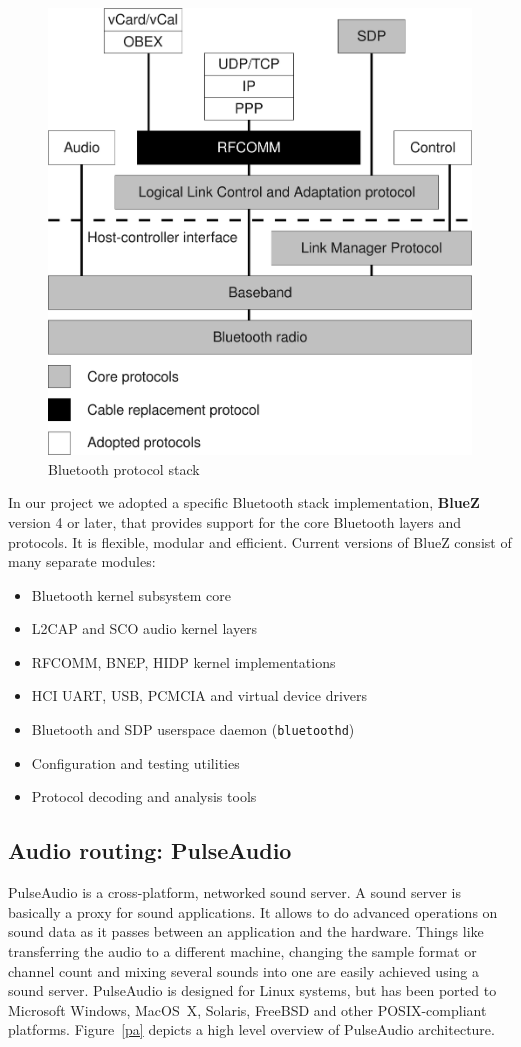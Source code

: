 \documentclass[conference]{IEEEtran}
\begin{document}
\begin{figure}[h]
\centering
\includegraphics[width=0.9\columnwidth]{BTstack}
\caption{Bluetooth protocol stack}
\label{btstack}
\end{figure}

In our project we adopted a specific Bluetooth stack implementation, \textbf{BlueZ} version 4 or later, that provides support for the core Bluetooth layers and protocols. It is flexible, modular and efficient. Current versions of BlueZ consist of many separate modules:
\begin{itemize}
\item Bluetooth kernel subsystem core
\item L2CAP and SCO audio kernel layers
\item RFCOMM, BNEP, HIDP kernel implementations
\item HCI UART, USB, PCMCIA and virtual device drivers
\item Bluetooth and SDP userspace daemon (\texttt{bluetoothd})
\item Configuration and testing utilities
\item Protocol decoding and analysis tools
\end{itemize}

\subsection{Audio routing: PulseAudio}
PulseAudio is a cross-platform, networked sound server. A sound server is basically a proxy for sound applications. It allows to do advanced operations on sound data as it passes between an application and the hardware. Things like transferring the audio to a different machine, changing the sample format or channel count and mixing several sounds into one are easily achieved using a sound server. PulseAudio is designed for Linux systems, but has been ported to Microsoft Windows, MacOS~X, Solaris, FreeBSD and other POSIX-compliant platforms. Figure~\ref{pa} depicts a high level overview of PulseAudio architecture.
\end{document}
